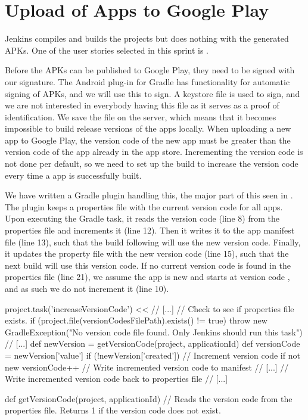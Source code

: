 \chapter{Upload of Apps to Google Play}\label{sec:upload_google_play}
Jenkins compiles and builds the projects but does nothing with the generated APKs. One of the user stories selected in this sprint is .

Before the APKs can be published to Google Play, they need to be signed with our signature. The Android plug-in for Gradle has functionality for automatic signing of APKs, and we will use this to sign. A keystore file is used to sign, and we are not interested in everybody having this file as it serves as a proof of identification. We save the file on the server, which means that it becomes impossible to build release versions of the apps locally.
When uploading a new app to Google Play, the version code of the new app must be greater than the version code of the app already in the app store. Incrementing the version code is not done per default, so we need to set up the build to increase the version code every time a app is successfully built. 

We have written a Gradle plugin handling this, the major part of this seen in . The plugin keeps a properties file with the current version code for all apps. Upon executing the  Gradle task, it reads the version code (line 8) from the properties file and increments it (line 12). Then it writes it to the app manifest file (line 13), such that the build following will use the new version code. Finally, it updates the property file with the new version code (line 15), such that the next build will use this version code. If no current version code is found in the properties file (line 21), we assume the app is new and starts at version code , and as such we do not increment it (line 10).
\begin{gradlecode}[caption=Part of our Gradle plugin for updating version code,label=lst:gradle_versioncode]
project.task('increaseVersionCode') << {
    // [...]
    // Check to see if properties file exists.
    if (project.file(versionCodesFilePath).exists() != true) {
        throw new GradleException("No version code file found. Only Jenkins should run this task")
    }
    // [...]
    def newVersion = getVersionCode(project, applicationId)
    def versionCode = newVersion['value']
    if (!newVersion['created']) {
        // Increment version code if not new
        versionCode++
        // Write incremented version code to manifest
        // [...]
        // Write incremented version code back to properties file
        // [...]
    }
}

def getVersionCode(project, applicationId) {
    // Reads the version code from the properties file. Returns 1 if the version code does not exist.
}
\end{gradlecode}
 
